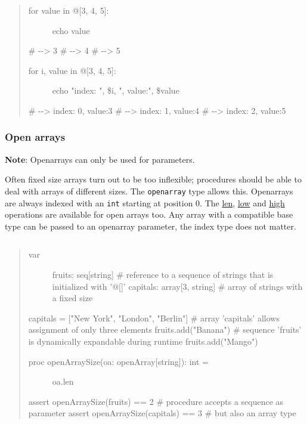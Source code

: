 \begin{verbatim}
\end{verbatim}

\begin{quote}
\begin{description}
\item[for value in @{[}3, 4, 5{]}:]
echo value
\end{description}

\# -\/-\textgreater{} 3 \# -\/-\textgreater{} 4 \# -\/-\textgreater{} 5

\begin{description}
\item[for i, value in @{[}3, 4, 5{]}:]
echo "index: ", \$i, ", value:", \$value
\end{description}

\# -\/-\textgreater{} index: 0, value:3 \# -\/-\textgreater{} index: 1,
value:4 \# -\/-\textgreater{} index: 2, value:5
\end{quote}

\hypertarget{open-arrays}{%
\subsubsection{Open arrays}\label{open-arrays}}

\textbf{Note}: Openarrays can only be used for parameters.

Often fixed size arrays turn out to be too inflexible; procedures should
be able to deal with arrays of different sizes. The \texttt{openarray}
type allows this. Openarrays are always indexed with an \texttt{int}
starting at position 0. The \href{system.html\#len,TOpenArray}{len},
\href{system.html\#low,openArray\%5BT\%5D}{low} and
\href{system.html\#high,openArray\%5BT\%5D}{high} operations are
available for open arrays too. Any array with a compatible base type can
be passed to an openarray parameter, the index type does not matter.

\begin{verbatim}
\end{verbatim}

\begin{quote}
\begin{description}
\item[var]
fruits: seq{[}string{]} \# reference to a sequence of strings that is
initialized with '@{[}{]}' capitals: array{[}3, string{]} \# array of
strings with a fixed size
\end{description}

capitals = {[}"New York", "London", "Berlin"{]} \# array 'capitals'
allows assignment of only three elements fruits.add("Banana") \#
sequence 'fruits' is dynamically expandable during runtime
fruits.add("Mango")

\begin{description}
\item[proc openArraySize(oa: openArray{[}string{]}): int =]
oa.len
\end{description}

assert openArraySize(fruits) == 2 \# procedure accepts a sequence as
parameter assert openArraySize(capitals) == 3 \# but also an array type
\end{quote}


